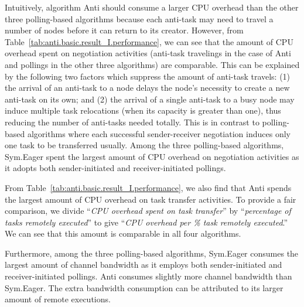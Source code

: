 Intuitively, algorithm {\sc Anti} should consume a larger CPU overhead
than the other three polling-based algorithms because each anti-task 
may need to travel a number of nodes before it can return to its creator.
However, from Table~\ref{tab:anti.basic.result_I.performance}, 
we can see that the amount of CPU overhead spent on negotiation activities 
(anti-task travelings in the case of {\sc Anti}
and pollings in the other three algorithms) are comparable.
%
This can be explained by the following two factors which
suppress the amount of anti-task travels:
%
(1) the arrival of an anti-task to a node delays the node's necessity to 
create a new anti-task on its own; and
(2) the arrival of a single anti-task to a busy node may induce
multiple task relocations (when its capacity is greater than one),
thus reducing the number of anti-tasks needed totally.
This is in contrast to polling-based algorithms where 
each successful sender-receiver negotiation induces only 
one task to be transferred usually.
%
Among the three polling-based algorithms, 
{\sc Sym.Eager} spent the largest amount of CPU overhead on 
negotiation activities as it adopts both sender-initiated and
receiver-initiated pollings.

From Table~\ref{tab:anti.basic.result_I.performance}, we also find that
{\sc Anti} spends the largest amount of CPU overhead on task transfer activities.
To provide a fair comparison, we divide 
``{\it CPU overhead spent on task transfer\/}''  by
``{\it percentage of tasks remotely executed\/}'' to give
``{\it CPU overhead per \% task remotely executed\/}.''
We can see that this amount is comparable in all 
four algorithms.

Furthermore, among the three polling-based algorithms, 
{\sc Sym.Eager} consumes the largest amount of channel bandwidth
as it employs both sender-initiated and receiver-initiated pollings.
{\sc Anti} consumes slightly more channel bandwidth than {\sc Sym.Eager}.
The extra bandwidth consumption can be attributed to its
larger amount of remote executions.

